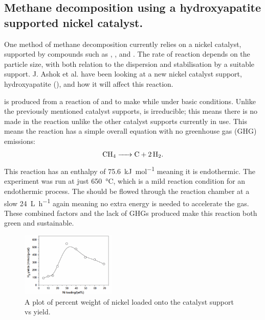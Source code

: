 \subsection{Methane decomposition using a hydroxyapatite supported nickel catalyst.}%
\label{sub:methane_decomposition_using_a_hydroxyapatite_supported_nickel_catalyst_}
One method of methane decomposition currently relies on a nickel catalyst, supported by compounds such as , ,  and .
The rate of reaction depends on the  particle size, with both relation to the dispersion and stabilisation by a suitable support\cite{Ashok}.
J. Ashok et al. have been looking at a new nickel catalyst support, hydroxyapatite (), and how it will affect this reaction.

  is produced from a reaction of  and  to make \ce{[Ca5(PO4)3(OH)]} while under basic conditions\cite{Ashok}.
Unlike the previously mentioned catalyst supports,  is irreducible; this means there is no  made in the reaction unlike the other catalyst supports currently in use.
This means the reaction has a simple overall equation with no greenhouse gas (GHG) emissions:
\begin{align}
	\ce{CH4 -> C +2H2}
.\end{align}
This reaction has an enthalpy of \SI{75.6}{\kilo\joule\per\mole} meaning it is endothermic.
The experiment was run at just \SI{650}{\celsius}\cite{Ashok}, which is a mild reaction condition for an endothermic process.
The  should be flowed through the reaction chamber at a slow \SI{24}{\liter\per\hour}\cite{Ashok} again meaning no extra energy is needed to accelerate the gas.
These combined factors and the lack of GHGs produced make this reaction both green and sustainable.

\begin{figure}[H]
	\centering
	\includegraphics[width=0.4\textwidth]{539a7840-2cb8-11eb-895f-8c8590753a48.png}
	\caption{A plot of percent weight of nickel loaded onto the catalyst support vs  yield.}  
	\label{fig:MD_plot1}
\end{figure}

